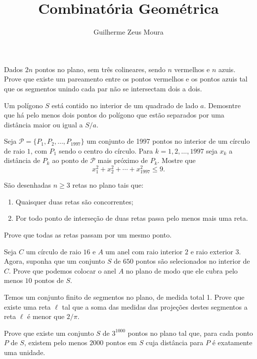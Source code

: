 \documentclass[10pt,a4paper]{article}
\title{Combinatória Geométrica}
\author{Guilherme Zeus Moura}
\begin{document}
	
	\zeustitle
	\begin{prob}
		Dados $2n$ pontos no plano, sem três colineares, sendo $n$ vermelhos e $n$ azuis. Prove que existe um pareamento entre os pontos vermelhos e os pontos azuis tal que os segmentos unindo cada par não se intersectam dois a dois.
	\end{prob}
	\begin{prob}
		Um polígono $S$ está contido no interior de um quadrado de lado $a$. Demosntre que há pelo menos dois pontos do polígono que estão separados por uma distância maior ou igual a $S/a$.
	\end{prob}
	\begin{prob}[Ibero 1997]
		Seja $\mathcal{P} = \{P_1, P_2, \dots, P_{1997}\}$ um conjunto de 1997 pontos no interior de um círculo de raio $1$, com $P_1$ sendo o centro do círculo. Para $k = 1, 2, \dots, 1997$ seja $x_k$ a distância de $P_k$ ao ponto de $\mathcal{P}$ mais próximo de $P_k$. Mostre que $$ x_1^2 + x_2^2 + \cdots + x_{1997}^2 \le 9.$$
	\end{prob}
	\begin{prob}
		São desenhadas $n \ge 3$ retas no plano tais que:
		\begin{enumerate}[label = (\roman*)]
			\item Quaisquer duas retas são concorrentes;
			\item Por todo ponto de interseção de duas retas passa pelo menos mais uma reta.
		\end{enumerate}
		Prove que todas as retas passam por um mesmo ponto.
	\end{prob}
	\begin{prob}
		Seja $C$ um círculo de raio $16$ e $A$ um anel com raio interior $2$ e raio exterior $3$. Agora, suponha que um conjunto $S$ de $650$ pontos são selecionados no interior de $C$. Prove que podemos colocar o anel $A$ no plano de modo que ele cubra pelo menos $10$ pontos de $S$.
	\end{prob}
	\begin{prob}
		Temos um conjunto finito de segmentos no plano, de medida total 1. Prove que existe uma reta $\ell$ tal que a soma das medidas das projeções destes segmentos a reta $\ell$ é menor que $2/\pi$.
	\end{prob}
	\begin{prob}
		Prove que existe um conjunto $S$ de $3^{1000}$ pontos no plano tal que, para cada ponto $P$ de $S$, existem pelo menos $2000$ pontos em $S$ cuja distância para $P$ é exatamente uma unidade.
	\end{prob}
\end{document}

